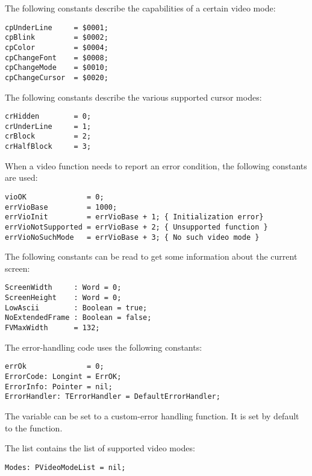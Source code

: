 The following constants describe the capabilities of a certain video mode:
\begin{verbatim}
cpUnderLine     = $0001;
cpBlink         = $0002;
cpColor         = $0004;
cpChangeFont    = $0008;
cpChangeMode    = $0010;
cpChangeCursor  = $0020;
\end{verbatim}
The following constants describe the various supported cursor modes:
\begin{verbatim}
crHidden        = 0;
crUnderLine     = 1;
crBlock         = 2;
crHalfBlock     = 3;
\end{verbatim}
When a video function needs to report an error condition, the following
constants are used:
\begin{verbatim}
vioOK              = 0;
errVioBase         = 1000;
errVioInit         = errVioBase + 1; { Initialization error}
errVioNotSupported = errVioBase + 2; { Unsupported function }
errVioNoSuchMode   = errVioBase + 3; { No such video mode }
\end{verbatim}
The following constants can be read to get some information about the
current screen:
\begin{verbatim}
ScreenWidth     : Word = 0;
ScreenHeight    : Word = 0;
LowAscii        : Boolean = true;
NoExtendedFrame : Boolean = false;
FVMaxWidth      = 132;
\end{verbatim}
The error-handling code uses the following constants:
\begin{verbatim}
errOk              = 0;
ErrorCode: Longint = ErrOK;
ErrorInfo: Pointer = nil;
ErrorHandler: TErrorHandler = DefaultErrorHandler;
\end{verbatim}
The  variable can be set to a custom-error handling
function. It is set by default to the  function.

The  list contains the list of supported video modes:
\begin{verbatim}
Modes: PVideoModeList = nil;
\end{verbatim}

